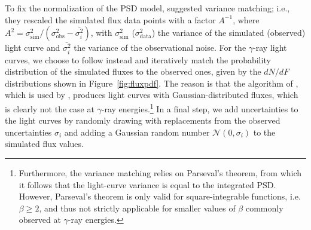 \documentclass[twocolumn]{aastex62}
\newcommand{\gray}{$\gamma$-ray\xspace}
\begin{document}
To fix the normalization of the PSD model, \citet{2014MNRAS.445..437M} suggested variance matching; i.e., they rescaled the simulated flux data points with a factor $A^{-1}$, where $A^2 = \sigma_\mathrm{sim}^2 / (\sigma_\mathrm{obs}^2 - \bar{\sigma_i^2})$, with $\sigma_\mathrm{sim}^2$ ($\sigma_\mathrm{data}^2$) the variance of the simulated (observed) light curve and $\bar{\sigma_i^2}$ the variance of the observational noise.
For the \gray light curves, we choose to follow \citet{2013MNRAS.433..907E} instead and iteratively match the probability distribution of the simulated fluxes to the observed ones, given by the $dN/dF$ distributions shown in Figure~\ref{fig:fluxpdf}. 
The reason is that the algorithm of \citet{1995A&A...300..707T}, which is used by \citet{2014MNRAS.445..437M}, produces light curves with Gaussian-distributed fluxes, which is clearly not the case at \gray energies.\footnote{Furthermore, the variance matching relies on Parseval's theorem, from which it follows that the light-curve variance is equal to the integrated PSD. However, Parseval's theorem is only valid for square-integrable functions, i.e. $\beta \geqslant 2$, and thus not strictly applicable for smaller values of $\beta$ commonly observed at \gray energies.}
In a final step, we add uncertainties to the light curves by randomly drawing with replacements from the observed uncertainties $\sigma_i$ and adding a Gaussian random number $\mathcal{N}(0,\sigma_i)$ to the simulated flux values.
\end{document}
